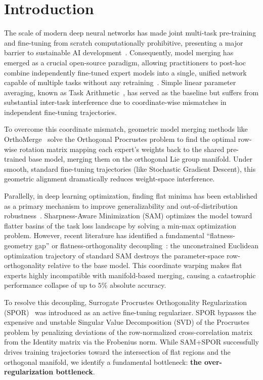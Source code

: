 \documentclass{article}
\theoremstyle{plain}
\theoremstyle{definition}
\theoremstyle{remark}
\begin{document}
\section{Introduction}
\label{sec:intro}

The scale of modern deep neural networks has made joint multi-task pre-training and fine-tuning from scratch computationally prohibitive, presenting a major barrier to sustainable AI development~\cite{wortsman2022model,yadav2023ties}. Consequently, model merging has emerged as a crucial open-source paradigm, allowing practitioners to post-hoc combine independently fine-tuned expert models into a single, unified network capable of multiple tasks without any retraining~\cite{yang2023adamerging,sung2023empirical}. Simple linear parameter averaging, known as Task Arithmetic~\cite{ilharco2022editing}, has served as the baseline but suffers from substantial inter-task interference due to coordinate-wise mismatches in independent fine-tuning trajectories. 

To overcome this coordinate mismatch, geometric model merging methods like OrthoMerge~\cite{yang2026orthogonal} solve the Orthogonal Procrustes problem to find the optimal row-wise rotation matrix mapping each expert's weights back to the shared pre-trained base model, merging them on the orthogonal Lie group manifold. Under smooth, standard fine-tuning trajectories (like Stochastic Gradient Descent), this geometric alignment dramatically reduces weight-space interference. 

Parallelly, in deep learning optimization, finding flat minima has been established as a primary mechanism to improve generalizability and out-of-distribution robustness~\cite{foret2021sharpness,cha2021swad}. Sharpness-Aware Minimization (SAM) optimizes the model toward flatter basins of the task loss landscape by solving a min-max optimization problem. However, recent literature has identified a fundamental ``flatness-geometry gap'' or flatness-orthogonality decoupling~\cite{yang2026orthogonal}: the unconstrained Euclidean optimization trajectory of standard SAM destroys the parameter-space row-orthogonality relative to the base model. This coordinate warping makes flat experts highly incompatible with manifold-based merging, causing a catastrophic performance collapse of up to $5\%$ absolute accuracy.

To resolve this decoupling, Surrogate Procrustes Orthogonality Regularization (SPOR)~\cite{yang2026orthogonal} was introduced as an active fine-tuning regularizer. SPOR bypasses the expensive and unstable Singular Value Decomposition (SVD) of the Procrustes problem by penalizing deviations of the row-normalized cross-correlation matrix from the Identity matrix via the Frobenius norm. While SAM+SPOR successfully drives training trajectories toward the intersection of flat regions and the orthogonal manifold, we identify a fundamental bottleneck: \textbf{the over-regularization bottleneck}.
\end{document}
